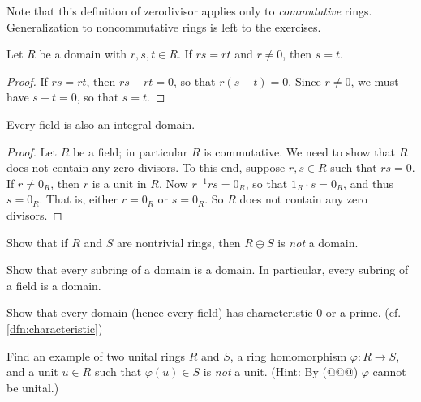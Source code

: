 Note that this definition of zerodivisor applies only to \emph{commutative} rings.
Generalization to noncommutative rings is left to the exercises.

\begin{prop}[Cancellation] \label{prop:cancellation}
Let \(R\) be a domain with \(r,s,t \in R\).
If \(rs = rt\) and \(r \neq 0\), then \(s = t\).
\end{prop}

\begin{proof}
If \(rs = rt\), then \(rs - rt = 0\), so that \(r(s-t) = 0\).
Since \(r \neq 0\), we must have \(s-t = 0\), so that \(s = t\).
\end{proof}


\begin{prop}
Every field is also an integral domain.
\end{prop}

\begin{proof}
Let \(R\) be a field; in particular \(R\) is commutative.
We need to show that \(R\) does not contain any zero divisors.
To this end, suppose \(r,s \in R\) such that \(rs = 0\).
If \(r \neq 0_R\), then \(r\) is a unit in \(R\).
Now \(r^{-1}rs = 0_R\), so that \(1_R \cdot s = 0_R\), and thus \(s = 0_R\).
That is, either \(r = 0_R\) or \(s = 0_R\).
So \(R\) does not contain any zero divisors.
\end{proof}



\Exercises%

\begin{exercise}
Show that if \(R\) and \(S\) are nontrivial rings, then \(R \oplus S\) is \emph{not} a domain.
\end{exercise}

\begin{exercise}
Show that every subring of a domain is a domain.
In particular, every subring of a field is a domain.
\end{exercise}

\begin{exercise}
Show that every domain (hence every field) has characteristic 0 or a prime.
(cf. \ref{dfn:characteristic})
\end{exercise}

\begin{exercise}
Find an example of two unital rings \(R\) and \(S\), a ring homomorphism \(\varphi : R \rightarrow S\), and a unit \(u \in R\) such that \(\varphi(u) \in S\) is \emph{not} a unit.
(Hint: By (@@@) \(\varphi\) cannot be unital.)
\end{exercise}

